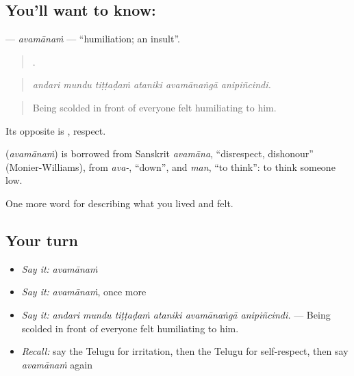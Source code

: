 \subsection*{You'll want to know: }
\textbf{} — \emph{avamānaṁ} — \textquotedblleft{}humiliation; an insult\textquotedblright{}.

\begin{quote}
     .
\end{quote}

\begin{quote}
\emph{andari mundu tiṭṭaḍaṁ ataniki avamānaṅgā anipiñcindi.}
\end{quote}

\begin{quote}
Being scolded in front of everyone felt humiliating to him.
\end{quote}

Its opposite is , respect.

\begin{cousinweb}
\textbf{} (\emph{avamānaṁ}) is borrowed from Sanskrit \emph{avamāna}, \textquotedblleft{}disrespect, dishonour\textquotedblright{} (Monier-Williams), from \emph{ava-}, \textquotedblleft{}down\textquotedblright{}, and \emph{man}, \textquotedblleft{}to think\textquotedblright{}: to think someone low.
\end{cousinweb}

\begin{grammarlens}[title={What you've built}]
One more word for describing what you lived and felt.
\end{grammarlens}

\subsection*{Your turn}
\begin{itemize}
\raggedright
  \item \emph{Say it:} \emph{avamānaṁ}
  \item \emph{Say it:} \emph{avamānaṁ}, once more
  \item \emph{Say it:} \emph{andari mundu tiṭṭaḍaṁ ataniki avamānaṅgā anipiñcindi.} — Being scolded in front of everyone felt humiliating to him.
  \item \emph{Recall:} say the Telugu for irritation, then the Telugu for self-respect, then say \emph{avamānaṁ} again
\end{itemize}

